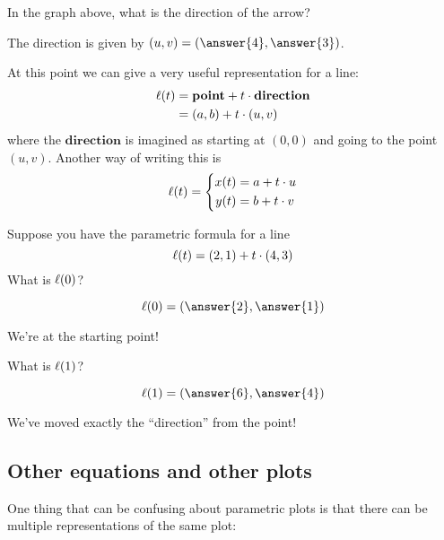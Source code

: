 \documentclass{ximera}
\begin{document}
\begin{question}
  In the graph above, what is the direction of the arrow?
  \begin{prompt}
    The direction is given by $(u,v) = \left(\answer{4},\answer{3}\right)$.
  \end{prompt}
\end{question}

At this point we can give a very useful representation for a line:
\begin{align*}
  \ell(t) &= \mathbf{point} + t\cdot \mathbf{direction}\\
  &= (a,b) + t \cdot(u,v)
\end{align*}
where the $\mathbf{direction}$ is imagined as starting at $(0,0)$ and going
to the point $(u,v)$. Another way of writing this is
\[
\ell(t) = \left\{\begin{aligned}
  x(t) &= a + t\cdot u\\
  y(t) &= b + t\cdot v
\end{aligned}\right.
\]
\begin{question}
  Suppose you have the parametric formula for a line
  \[
  \ell(t) = (2,1) + t \cdot(4,3)
  \]
  What is $\ell(0)$?
  \begin{prompt}
    \[
    \l(0) = \left(\answer{2},\answer{1}\right)
    \]
  \end{prompt}
  \begin{feedback}
    We're at the starting point!
  \end{feedback}
  \begin{question}
     What is $\ell(1)$?
  \begin{prompt}
    \[
    \l(1) = \left(\answer{6},\answer{4}\right)
    \]
  \end{prompt}
  \begin{feedback}
    We've moved exactly the ``direction'' from the  point!
  \end{feedback}
  \end{question}
\end{question}


\subsection{Other equations and other plots}

One thing that can be confusing about parametric plots is that there
can be multiple representations of the same plot:
\end{document}
